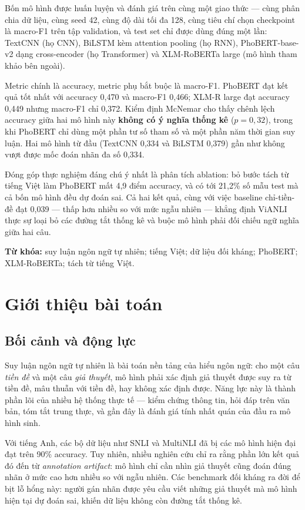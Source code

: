 \documentclass[12pt,a4paper,oneside]{report}
\begin{document}
Bốn mô hình được huấn luyện và đánh giá trên cùng một giao thức --- cùng phân chia dữ
liệu, cùng seed 42, cùng độ dài tối đa 128, cùng tiêu chí chọn checkpoint là macro-F1 trên
tập validation, và test set chỉ được dùng đúng một lần: TextCNN (họ CNN), BiLSTM kèm
attention pooling (họ RNN), PhoBERT-base-v2 dạng cross-encoder (họ Transformer) và
XLM-RoBERTa large (mô hình tham khảo bên ngoài).

Metric chính là accuracy, metric phụ bắt buộc là macro-F1. PhoBERT đạt kết quả tốt nhất
với accuracy 0,470 và macro-F1 0,466; XLM-R large đạt accuracy 0,449 nhưng macro-F1 chỉ
0,372. Kiểm định McNemar cho thấy chênh lệch accuracy giữa hai mô hình này \textbf{không
có ý nghĩa thống kê} ($p = 0{,}32$), trong khi PhoBERT chỉ dùng một phần tư số tham số và
một phần năm thời gian suy luận. Hai mô hình từ đầu (TextCNN 0,334 và BiLSTM 0,379) gần
như không vượt được mốc đoán nhãn đa số 0,334.

Đóng góp thực nghiệm đáng chú ý nhất là phân tích ablation: bỏ bước tách từ tiếng Việt làm
PhoBERT mất 4,9 điểm accuracy, và có tới 21,2\% số mẫu test mà cả bốn mô hình đều dự đoán
sai. Cả hai kết quả, cùng với việc baseline chỉ-tiền-đề đạt 0,039 --- thấp hơn nhiều so
với mức ngẫu nhiên --- khẳng định ViANLI thực sự loại bỏ các đường tắt thống kê và buộc mô
hình phải đối chiếu ngữ nghĩa giữa hai câu.

\vspace{5mm}
\noindent\textbf{Từ khóa:} suy luận ngôn ngữ tự nhiên; tiếng Việt; dữ liệu đối kháng;
PhoBERT; XLM-RoBERTa; tách từ tiếng Việt.

\chapter{Giới thiệu bài toán}

\section{Bối cảnh và động lực}

Suy luận ngôn ngữ tự nhiên là bài toán nền tảng của hiểu ngôn ngữ: cho một câu
\textit{tiền đề} và một câu \textit{giả thuyết}, mô hình phải xác định giả thuyết được
suy ra từ tiền đề, mâu thuẫn với tiền đề, hay không xác định được. Năng lực này là thành
phần lõi của nhiều hệ thống thực tế --- kiểm chứng thông tin, hỏi đáp trên văn bản, tóm
tắt trung thực, và gần đây là đánh giá tính nhất quán của đầu ra mô hình sinh.

Với tiếng Anh, các bộ dữ liệu như SNLI và MultiNLI đã bị các mô hình hiện đại đạt trên
90\% accuracy. Tuy nhiên, nhiều nghiên cứu chỉ ra rằng phần lớn kết quả đó đến từ
\textit{annotation artifact}: mô hình chỉ cần nhìn giả thuyết cũng đoán đúng nhãn ở mức
cao hơn nhiều so với ngẫu nhiên. Các benchmark đối kháng ra đời để bịt lỗ hổng này: người
gán nhãn được yêu cầu viết những giả thuyết mà mô hình hiện tại dự đoán sai, khiến dữ liệu
không còn đường tắt thống kê.
\end{document}
